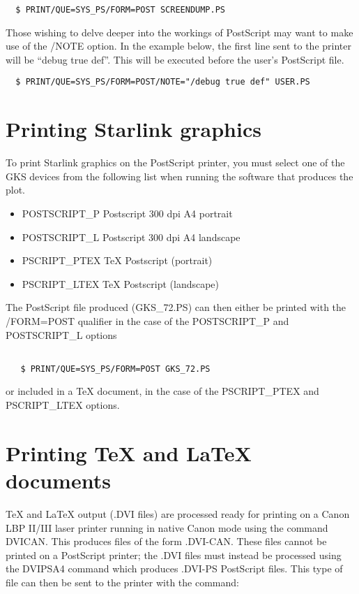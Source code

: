\begin{verbatim}
  $ PRINT/QUE=SYS_PS/FORM=POST SCREENDUMP.PS
\end{verbatim}

Those wishing to delve deeper into the workings of PostScript may want to 
make use of the /NOTE option. In the example below, the first line sent to
the printer will be ``debug true def''. This will be executed before the
user's PostScript file.

\begin{verbatim}
  $ PRINT/QUE=SYS_PS/FORM=POST/NOTE="/debug true def" USER.PS
\end{verbatim}

\section{Printing Starlink graphics}

To print Starlink graphics on the PostScript printer, you must select 
one of the GKS devices from the following list when running
the software that produces the plot.

\begin{itemize}
\item  POSTSCRIPT\_P    Postscript 300 dpi A4 portrait
\item  POSTSCRIPT\_L    Postscript 300 dpi A4 landscape
\item  PSCRIPT\_PTEX    TeX Postscript (portrait)
\item  PSCRIPT\_LTEX    TeX Postscript (landscape)
\end{itemize}

The PostScript file produced (GKS\_72.PS) can then either be printed with the
/FORM=POST qualifier in the case of the POSTSCRIPT\_P and POSTSCRIPT\_L
options

\begin{verbatim}

   $ PRINT/QUE=SYS_PS/FORM=POST GKS_72.PS

\end{verbatim}

or included in a \TeX\/ document, in the case of the PSCRIPT\_PTEX and
PSCRIPT\_LTEX options.


\section{Printing \TeX\/ and \LaTeX\/ documents}

\TeX\/ and \LaTeX \/ output (.DVI files) are processed ready for printing on a
Canon LBP II/III laser printer running in native Canon mode  using the command
DVICAN. This produces files of the form .DVI-CAN. These files cannot be printed
on a PostScript printer; the .DVI files must instead be processed using the 
DVIPSA4 command which produces .DVI-PS PostScript files. This type of file can 
then be sent to the printer with the command:

